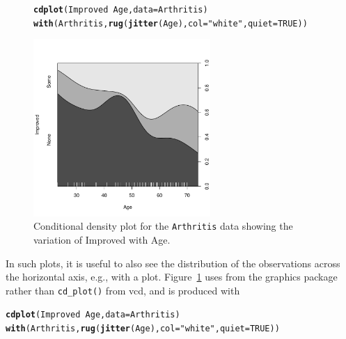 \documentclass[10pt,twoside]{article}\usepackage[]{graphicx}\usepackage[]{color}
\makeatletter
\newcommand{\hlnum}[1]{\textcolor[rgb]{0.686,0.059,0.569}{#1}}%
\newcommand{\hlstr}[1]{\textcolor[rgb]{0.192,0.494,0.8}{#1}}%
\newcommand{\hlopt}[1]{\textcolor[rgb]{0,0,0}{#1}}%
\newcommand{\hlstd}[1]{\textcolor[rgb]{0.345,0.345,0.345}{#1}}%
\newcommand{\hlkwc}[1]{\textcolor[rgb]{0.333,0.667,0.333}{#1}}%
\newcommand{\hlkwd}[1]{\textcolor[rgb]{0.737,0.353,0.396}{\textbf{#1}}}%
\newenvironment{kframe}{%
 \def\at@end@of@kframe{}%
 \ifinner\ifhmode%
  \def\at@end@of@kframe{\end{minipage}}%
  \begin{minipage}{\columnwidth}%
 \fi\fi%
 \def\FrameCommand##1{\hskip\@totalleftmargin \hskip-\fboxsep
 \colorbox{shadecolor}{##1}\hskip-\fboxsep
     \hskip-\linewidth \hskip-\@totalleftmargin \hskip\columnwidth}%
 \MakeFramed {\advance\hsize-\width
   \@totalleftmargin\z@ \linewidth\hsize
   \@setminipage}}%
 {\par\unskip\endMakeFramed%
 \at@end@of@kframe}
\newenvironment{knitrout}{}{} %
\newcommand{\figref}[1]{Figure~\ref{#1}}
\newcommand{\data}[1]{\texttt{#1}}
\newcommand{\codefun}[1]{\code{#1()}}
\newcommand{\pkg}[1]{{\normalfont\fontseries{b}\selectfont #1}}
\makeatother
\begin{document}
\begin{figure}[htb]
\begin{center}
\begin{knitrout}
\color{fgcolor}\begin{kframe}
\begin{alltt}
\hlkwd{cdplot}\hlstd{(Improved} \hlopt{~} \hlstd{Age,} \hlkwc{data} \hlstd{= Arthritis)}
\hlkwd{with}\hlstd{(Arthritis,} \hlkwd{rug}\hlstd{(}\hlkwd{jitter}\hlstd{(Age),} \hlkwc{col}\hlstd{=}\hlstr{"white"}\hlstd{,} \hlkwc{quiet}\hlstd{=}\hlnum{TRUE}\hlstd{))}
\end{alltt}
\end{kframe}
\end{knitrout}

\includegraphics[width=0.6\textwidth]{fig/vcd-tut-cdplot}
\caption{Conditional density plot for the \data{Arthritis} data
	showing the variation of Improved with Age.}
\label{fig:cd-plot}
\end{center}
\end{figure}

In such plots, it is useful to also see the distribution of the observations
across the horizontal axis, e.g., with a \codefun{rug} plot.
\figref{fig:cd-plot} uses \codefun{cdplot} from the \pkg{graphics} package
rather than \verb|cd_plot()| from \pkg{vcd}, and is produced with
\begin{knitrout}
\color{fgcolor}\begin{kframe}
\begin{alltt}
\hlkwd{cdplot}\hlstd{(Improved} \hlopt{~} \hlstd{Age,} \hlkwc{data} \hlstd{= Arthritis)}
\hlkwd{with}\hlstd{(Arthritis,} \hlkwd{rug}\hlstd{(}\hlkwd{jitter}\hlstd{(Age),} \hlkwc{col}\hlstd{=}\hlstr{"white"}\hlstd{,} \hlkwc{quiet}\hlstd{=}\hlnum{TRUE}\hlstd{))}
\end{alltt}
\end{kframe}
\end{knitrout}
\end{document}
